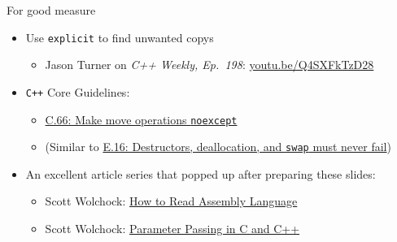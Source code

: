 \begin{frame}{For good measure}
    \begin{itemize}
        \item Use \texttt{explicit} to find unwanted copys
        \begin{itemize}
            \item Jason Turner on \textit{C++ Weekly, Ep.\ 198}: \href{https://youtu.be/Q4SXFkTzD28}{youtu.be/Q4SXFkTzD28}
        \end{itemize}
        \item \texttt{C++} Core Guidelines:
        \begin{itemize}
            \item \href{http://isocpp.github.io/CppCoreGuidelines/CppCoreGuidelines\#Rc-move-noexcept}{C.66: Make move operations \texttt{noexcept}}
            \item (Similar to \href{http://isocpp.github.io/CppCoreGuidelines/CppCoreGuidelines\#e16-destructors-deallocation-and-swap-must-never-fail}{E.16: Destructors, deallocation, and \texttt{swap} must never fail})
        \end{itemize}
        \item An excellent article series that popped up after preparing these slides:
        \begin{itemize}
            \item Scott Wolchock: \href{https://wolchok.org/posts/how-to-read-assembly-language/}{How to Read Assembly Language}
            \item Scott Wolchock: \href{https://wolchok.org/posts/parameter-passing/}{Parameter Passing in C and C++}
        \end{itemize}
    \end{itemize}
\end{frame}
